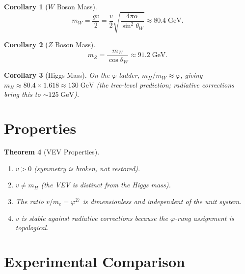\documentclass[12pt,a4paper]{article}
\newtheorem{theorem}{Theorem}[section]
\newtheorem{corollary}[theorem]{Corollary}
\theoremstyle{definition}
\theoremstyle{remark}
\begin{document}
\begin{corollary}[$W$ Boson Mass]
\begin{equation}
  m_W = \frac{gv}{2} = \frac{v}{2}\sqrt{\frac{4\pi\alpha}
  {\sin^2\theta_W}} \approx 80.4\;\mathrm{GeV}.
\end{equation}
\end{corollary}

\begin{corollary}[$Z$ Boson Mass]
\begin{equation}
  m_Z = \frac{m_W}{\cos\theta_W} \approx 91.2\;\mathrm{GeV}.
\end{equation}
\end{corollary}

\begin{corollary}[Higgs Mass]
On the $\varphi$-ladder, $m_H/m_W \approx \varphi$, giving
$m_H \approx 80.4 \times 1.618 \approx 130\;\mathrm{GeV}$ (the
tree-level prediction; radiative corrections bring this to
$\sim 125\;\mathrm{GeV}$).
\end{corollary}

\section{Properties}
\label{sec:properties}

\begin{theorem}[VEV Properties]
\begin{enumerate}[label=(\roman*)]
  \item $v > 0$ (symmetry is broken, not restored).
  \item $v \neq m_H$ (the VEV is distinct from the Higgs mass).
  \item The ratio $v/m_e = \varphi^{27}$ is dimensionless and
  independent of the unit system.
  \item $v$ is stable against radiative corrections because the
  $\varphi$-rung assignment is topological.
\end{enumerate}
\end{theorem}

\section{Experimental Comparison}
\label{sec:comparison}
\end{document}
